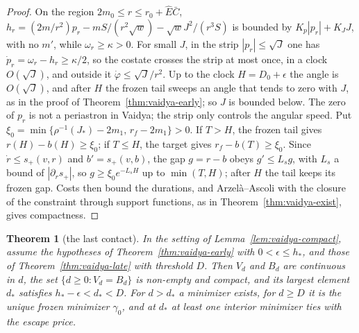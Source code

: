 \documentclass[aip,jmp,amsmath,amssymb,reprint]{revtex4-2}
\newcommand{\Ehat}{\hat E}
\theoremstyle{plain}
\newtheorem{theorem}{Theorem}
\theoremstyle{definition}
\begin{document}
\begin{proof}
On the region $2m_0\le r\le r_0+\Ehat\bar C$,
$h_r=(2m/r^2)p_r-mS/(r^2\sqrt w)-\sqrt wJ^2/(r^3S)$ is bounded by $K_p|p_r|+K_JJ$, with no $m'$, while
$\omega_r\ge\kappa>0$. For small $J$, in the strip $|p_r|\le\sqrt J$ one has $\dot p_r=\omega_r-h_r\ge\kappa/2$, so the
costate crosses the strip at most once, in a clock $O(\sqrt J)$, and outside it $\dot\varphi\le\sqrt J/r^2$. Up to the clock
$H=D_0+\epsilon$ the angle is $O(\sqrt J)$, and after $H$ the frozen tail sweeps an angle that tends to zero
with $J$, as in the proof of Theorem~\ref{thm:vaidya-early}; so $J$ is bounded below. The zero of $p_r$ is not
a periastron in Vaidya; the strip only controls the angular speed. Put
$\xi_0=\min\{\rho^{-1}(J_*)-2m_1,\,r_f-2m_1\}>0$. If $T>H$, the frozen tail gives $r(H)-b(H)\ge\xi_0$; if $T\le H$, the
target gives $r_f-b(T)\ge\xi_0$. Since $\dot r\le s_+(v,r)$ and $b'=s_+(v,b)$, the gap $g=r-b$ obeys $g'\le L_sg$, with
$L_s$ a bound of $|\partial_rs_+|$, so $g\ge\xi_0e^{-L_sH}$ up to $\min(T,H)$; after $H$ the tail keeps its frozen gap.
Costs then bound the durations, and Arzel\`a--Ascoli with the closure of the constraint through support
functions, as in Theorem~\ref{thm:vaidya-exist}, gives compactness.
\end{proof}

\begin{theorem}[the last contact]\label{thm:vaidya-contact}
In the setting of Lemma~\ref{lem:vaidya-compact}, assume the hypotheses of Theorem~\ref{thm:vaidya-early} with
$0<\epsilon\le h_*$, and those of Theorem~\ref{thm:vaidya-late} with threshold $D$. Then $V_d$ and $B_d$ are
continuous in $d$, the set $\{d\ge0:V_d=B_d\}$ is non-empty and compact, and its largest element $d_*$ satisfies
$h_*-\epsilon<d_*<D$. For $d>d_*$ a minimizer exists, for $d\ge D$ it is the unique frozen minimizer $\gamma_0$, and at
$d_*$ at least one interior minimizer ties with the escape price.
\end{theorem}
\end{document}
